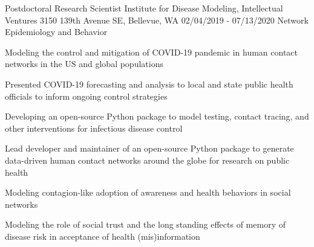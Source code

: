 \begin{cventries}
  \cventry
    {Postdoctoral Research Scientist} %
    {Institute for Disease Modeling, Intellectual Ventures
    } %
    {3150 139th Avenue SE, Bellevue, WA
    } %
    {02/04/2019 - 07/13/2020} %
    {Network Epidemiology and Behavior} %
    {
      \begin{cvitems} %
        \item {Modeling the control and mitigation of COVID-19 pandemic in human contact networks in the US and global populations}
        \item {Presented COVID-19 forecasting and analysis to local and state public health officials to inform ongoing control strategies}
        \item {Developing an open-source Python package to model testing, contact tracing, and other interventions for infectious disease control}
        \item {Lead developer and maintainer of an open-source Python package to generate data-driven human contact networks around the globe for research on public health}
      	\item {Modeling contagion-like adoption of awareness and health behaviors in social networks 
      	}
      	\item {Modeling the role of social trust and the long standing effects of memory of disease risk in acceptance of health (mis)information}

\end{cvitems}}
\end{cventries}
